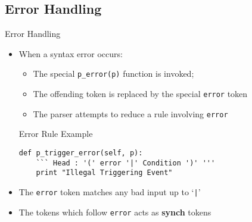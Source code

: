 \subsection{Error Handling}
\begin{frame}[fragile]{Error Handling}
  \begin{itemize}
    \item When a syntax error occurs: 
    \begin{itemize}
      \item The special \texttt{p\_error(p)} function is invoked;
      \item The offending token is replaced by the special \texttt{error} 
      token
      \item The parser attempts to reduce a rule involving \texttt{error}
    \end{itemize}
\n
\begin{exampleblock}{Error Rule Example}
\begin{verbatim}
def p_trigger_error(self, p):
    ``` Head : '(' error '|' Condition ')' '''
    print "Illegal Triggering Event"
\end{verbatim}
\end{exampleblock}
\n
   \item The \texttt{error} token matches any bad input up to `\texttt{|}'
\n
    \item The tokens which follow \texttt{error} acts as \textbf{synch} 
    tokens

  \end{itemize}
%
%
\N\N
\end{frame}



